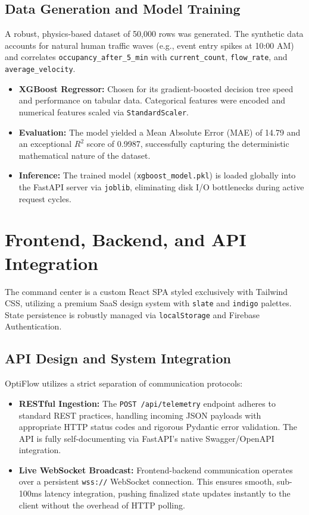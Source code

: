 \documentclass[11pt, a4paper]{article}
\begin{document}
\subsection{Data Generation and Model Training}
A robust, physics-based dataset of 50,000 rows was generated. The synthetic data accounts for natural human traffic waves (e.g., event entry spikes at 10:00 AM) and correlates \texttt{occupancy\_after\_5\_min} with \texttt{current\_count}, \texttt{flow\_rate}, and \texttt{average\_velocity}.
\begin{itemize}[leftmargin=*]
    \item \textbf{XGBoost Regressor:} Chosen for its gradient-boosted decision tree speed and performance on tabular data. Categorical features were encoded and numerical features scaled via \texttt{StandardScaler}.
    \item \textbf{Evaluation:} The model yielded a Mean Absolute Error (MAE) of 14.79 and an exceptional $R^2$ score of 0.9987, successfully capturing the deterministic mathematical nature of the dataset.
    \item \textbf{Inference:} The trained model (\texttt{xgboost\_model.pkl}) is loaded globally into the FastAPI server via \texttt{joblib}, eliminating disk I/O bottlenecks during active request cycles.
\end{itemize}

\section{Frontend, Backend, and API Integration}
The command center is a custom React SPA styled exclusively with Tailwind CSS, utilizing a premium SaaS design system with \texttt{slate} and \texttt{indigo} palettes. State persistence is robustly managed via \texttt{localStorage} and Firebase Authentication.

\subsection{API Design and System Integration}
OptiFlow utilizes a strict separation of communication protocols:
\begin{itemize}[leftmargin=*]
    \item \textbf{RESTful Ingestion:} The \texttt{POST /api/telemetry} endpoint adheres to standard REST practices, handling incoming JSON payloads with appropriate HTTP status codes and rigorous Pydantic error validation. The API is fully self-documenting via FastAPI's native Swagger/OpenAPI integration.
    \item \textbf{Live WebSocket Broadcast:} Frontend-backend communication operates over a persistent \texttt{wss://} WebSocket connection. This ensures smooth, sub-100ms latency integration, pushing finalized state updates instantly to the client without the overhead of HTTP polling.
\end{itemize}
\end{document}
